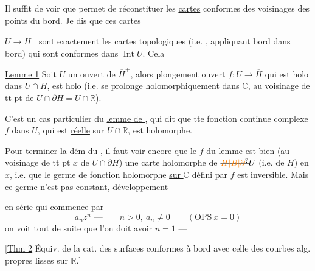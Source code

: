 Il suffit de voir que  permet de réconstituer les \uline{cartes} conformes des voisinages des points du bord. Je dis que ces cartes


$U\longrightarrow\overline H^{+}$ sont exactement les cartes topologiques (i.e. ,  appliquant bord dans bord) qui sont conformes dans $\operatorname{Int}U$. Cela  

\uline{Lemme 1} Soit $U$ un ouvert de $\overline H^{+}$, alors   plongement ouvert $f:U\longrightarrow\overline H$  qui est holo dans $U\cap H$, est holo (i.e. se prolonge holomorphiquement dans $\mathbb C$, au voisinage de tt pt de $U\cap\partial H=U\cap\mathbb R$).

C'est un cas particulier du \uline{lemme de }, qui dit que tte fonction  continue complexe $f$ dans $U$, qui est \uline{réelle} sur $U\cap\mathbb R$, est holomorphe.

Pour terminer la dém du  , il faut voir encore que le $f$ du lemme est bien (au voisinage de tt pt $x$ de $U\cap\partial H$) une carte holomorphe de $\deleted{\unsure{H|B|\partial}}U$ (i.e. de $H$) en $x$, i.e. que le germe  de fonction holomorphe \uline{sur $\mathbb C$} défini par $f$ est inversible. Mais  ce germe n'est pas constant,   développement


en série qui commence par
\[
a_n z^n\text{ ---}\qquad n>0,\ a_n\ne0\qquad(\mathrm{OPS}\ x=0)
\]
on voit tout de suite que l'on doit avoir $n=1$ ---


[\uline{Thm 2} Équiv. de la cat. des surfaces conformes à bord  avec celle des courbes alg. propres lisses sur $\mathbb R$.]


